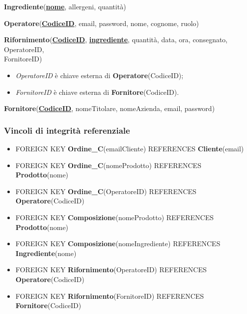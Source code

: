 \documentclass[12pt,a4paper]{article}
\begin{document}
    \begin{tcolorbox}[
        colback=gray!8,
        colframe=black!30,
        title=
    ]
        \textbf{Ingrediente}(\textbf{\uline{nome}}, allergeni, quantità)
    \end{tcolorbox}

    \begin{tcolorbox}[
        colback=gray!8,
        colframe=black!30,
        title=
    ]
        \textbf{Operatore}(\textbf{\uline{CodiceID}}, email, password, nome, cognome, ruolo)
    \end{tcolorbox}

    \begin{tcolorbox}[
        colback=gray!8,
        colframe=black!30,
        title=
    ]
        \textbf{Rifornimento}(\textbf{\uline{CodiceID}}, \textbf{\uline{ingrediente}}, quantità, data, ora, consegnato, OperatoreID, \\FornitoreID)
        \begin{itemize}[leftmargin=1em]
            \item \textit{OperatoreID} è chiave esterna di \textbf{Operatore}(CodiceID);
            \item \textit{FornitoreID} è chiave esterna di \textbf{Fornitore}(CodiceID).
        \end{itemize}
    \end{tcolorbox}

    \begin{tcolorbox}[
        colback=gray!8,
        colframe=black!30,
        title=
    ]
        \textbf{Fornitore}(\textbf{\uline{CodiceID}}, nomeTitolare, nomeAzienda, email, password) 
    \end{tcolorbox}
    
    \subsubsection{Vincoli di integrità referenziale}
    \begin{itemize}[leftmargin=1em]
        \item FOREIGN KEY \textbf{Ordine\_C}(emailCliente) REFERENCES \textbf{Cliente}(email)
        \item FOREIGN KEY \textbf{Ordine\_C}(nomeProdotto) REFERENCES \textbf{Prodotto}(nome)
        \item FOREIGN KEY \textbf{Ordine\_C}(OperatoreID) REFERENCES \textbf{Operatore}(CodiceID)
        \item FOREIGN KEY \textbf{Composizione}(nomeProdotto) REFERENCES \textbf{Prodotto}(nome)
        \item FOREIGN KEY \textbf{Composizione}(nomeIngrediente) REFERENCES \textbf{Ingrediente}(nome)
        \item FOREIGN KEY \textbf{Rifornimento}(OperatoreID) REFERENCES \textbf{Operatore}(CodiceID)
        \item FOREIGN KEY \textbf{Rifornimento}(FornitoreID) REFERENCES \textbf{Fornitore}(CodiceID)
    \end{itemize}
\end{document}
